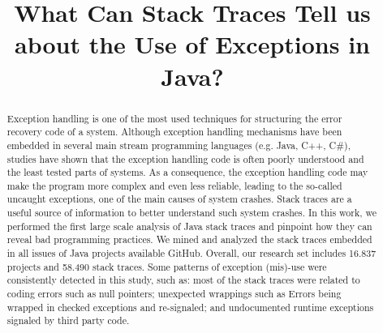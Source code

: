 \documentclass[conference]{IEEEtran}
\begin{document}
\title{What Can Stack Traces Tell us about the Use of Exceptions in Java?}

\author{
}

\newcommand{\todo}[1]{\textbf{TODO}\footnote{\textbf{TODO:} #1}}

\maketitle

\begin{abstract}
Exception handling is one of the most used techniques for structuring the error recovery code of a system. Although exception handling mechanisms have been embedded in several main stream programming languages (e.g. Java, C++, C\#), studies have shown that the exception handling code is often poorly understood and the least tested parts of systems. As a consequence, the exception handling code may make the program more complex and even less reliable, leading to the so-called uncaught exceptions, one of the main causes of system crashes. Stack traces are a useful source of information to better understand such system crashes. In this work, we performed the first large scale analysis of Java stack traces and pinpoint how they can reveal bad programming practices. We mined and analyzed the stack traces embedded in all issues of Java projects available GitHub. Overall, our research set includes 16.837 projects and 58.490 stack traces. Some patterns of exception (mis)-use were consistently detected in this study, such as: most of the stack traces were related to coding errors such as null pointers; unexpected wrappings such as Errors being wrapped in checked exceptions and re-signaled; and undocumented runtime exceptions signaled by third party code.
\end{abstract}

\end{document}
